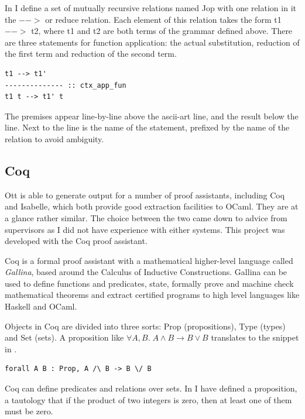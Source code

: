 \documentclass[12pt,twoside,notitlepage]{report}
\theoremstyle{plain}%
\theoremstyle{definition}
\theoremstyle{remark}
\begin{document}
In  I define a set of mutually recursive relations named Jop with one relation in it the $-->$ or reduce relation. Each element of this relation takes the form t1 $-->$ t2, where t1 and t2 are both terms of the grammar defined above. There are three statements for function application: the actual substitution, reduction of the first term and reduction of the second term. 

\begin{lstlisting}[language={Ott}, caption={Ott single reduction}]
t1 --> t1'
-------------- :: ctx_app_fun
t1 t --> t1' t
\end{lstlisting}

The premises appear line-by-line above the ascii-art line, and the result below the line. Next to the line is the name of the statement, prefixed by the name of the relation to avoid ambiguity. 



\subsection{Coq}
Ott is able to generate output for a number of proof assistants, including Coq and Isabelle, which both provide good extraction facilities to OCaml. They are at a glance rather similar. The choice between the two came down to advice from supervisors as I did not have experience with either systems. This project was developed with the Coq proof assistant. 

Coq is a formal proof assistant with a mathematical higher-level language called \textit{Gallina}, based around the Calculus of Inductive Constructions. Gallina can be used to define functions and predicates, state, formally prove and machine check mathematical theorems and extract certified programs to high level languages like Haskell and OCaml.


Objects in Coq are divided into three sorts: Prop (propositions), Type (types) and Set (sets).  A proposition like $ \forall A, B.\; A \wedge B \rightarrow B \vee B $ translates to the snippet in .


\begin{lstlisting}[language={Coq},caption={Coq Prop logic example},label={lst:coqproplogex}]
forall A B : Prop, A /\ B -> B \/ B
\end{lstlisting}


Coq can define predicates and relations over sets. In  I have defined a proposition, a tautology that if the product of two integers is zero, then at least one of them must be zero.
\end{document}
